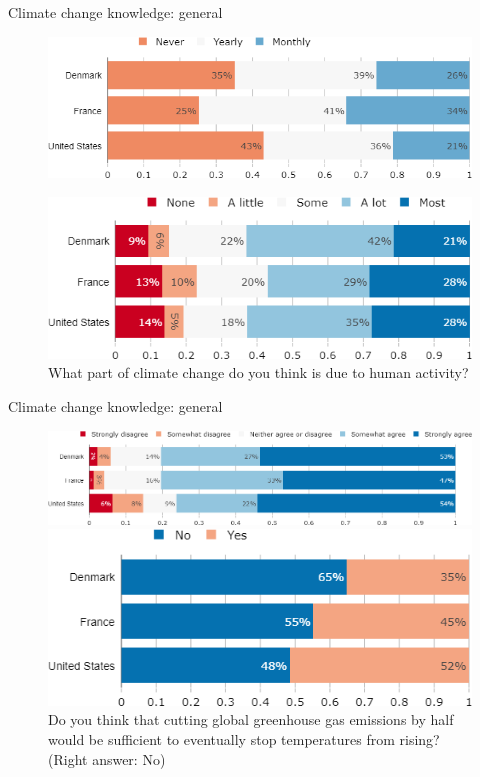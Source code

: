 \documentclass[aspectratio=169,9pt,dvipsnames]{beamer}
\begin{document}
\begin{frame}{Climate change knowledge: general}%
\begin{figure}[h!]
\centering
\caption{How often do you think or talk with people about climate change?}
\includegraphics[width=.6\textwidth]{../figures/country_comparison/CC_talks_countries.png}\\
\centering
\caption{What part of climate change do you think is due to human activity?}
\includegraphics[width=.6\textwidth]{../figures/country_comparison/CC_anthropogenic_countries.png}
\end{figure}
\end{frame}


\begin{frame}{Climate change knowledge: general}%
\begin{figure}[h!]
\centering
\caption{Do you agree or disagree with the following statement: ``Climate change is an important problem."}
\includegraphics[width=.6\textwidth]{../figures/country_comparison/CC_problem_countries.png}
\centering
\caption{Do you think that cutting global greenhouse gas emissions by half would be sufficient to eventually stop temperatures from rising? (Right answer: No)}
\includegraphics[width=.6\textwidth]{../figures/country_comparison/CC_dynamic_countries.png}
\end{figure}
\end{frame}
\end{document}
